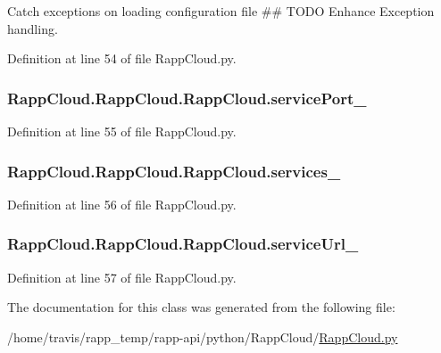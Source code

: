 Catch exceptions on loading configuration file \#\# T\-O\-D\-O Enhance Exception handling. 



Definition at line 54 of file Rapp\-Cloud.\-py.

\hypertarget{classRappCloud_1_1RappCloud_1_1RappCloud_a29102a58a5aaf453f7cb05901cb424c4}{
\subsubsection[{service\-Port\-\_\-}]{\setlength{\rightskip}{0pt plus 5cm}Rapp\-Cloud.\-Rapp\-Cloud.\-Rapp\-Cloud.\-service\-Port\-\_\-}}\label{classRappCloud_1_1RappCloud_1_1RappCloud_a29102a58a5aaf453f7cb05901cb424c4}


Definition at line 55 of file Rapp\-Cloud.\-py.

\hypertarget{classRappCloud_1_1RappCloud_1_1RappCloud_a342b68e2b06009953fe2ba715242f167}{
\subsubsection[{services\-\_\-}]{\setlength{\rightskip}{0pt plus 5cm}Rapp\-Cloud.\-Rapp\-Cloud.\-Rapp\-Cloud.\-services\-\_\-}}\label{classRappCloud_1_1RappCloud_1_1RappCloud_a342b68e2b06009953fe2ba715242f167}


Definition at line 56 of file Rapp\-Cloud.\-py.

\hypertarget{classRappCloud_1_1RappCloud_1_1RappCloud_a69edf9cbb678486d4b4f02d4f4dee62e}{
\subsubsection[{service\-Url\-\_\-}]{\setlength{\rightskip}{0pt plus 5cm}Rapp\-Cloud.\-Rapp\-Cloud.\-Rapp\-Cloud.\-service\-Url\-\_\-}}\label{classRappCloud_1_1RappCloud_1_1RappCloud_a69edf9cbb678486d4b4f02d4f4dee62e}


Definition at line 57 of file Rapp\-Cloud.\-py.



The documentation for this class was generated from the following file\-:\begin{DoxyCompactItemize}
\item 
/home/travis/rapp\-\_\-temp/rapp-\/api/python/\-Rapp\-Cloud/\hyperlink{RappCloud_8py}{Rapp\-Cloud.\-py}\end{DoxyCompactItemize}

